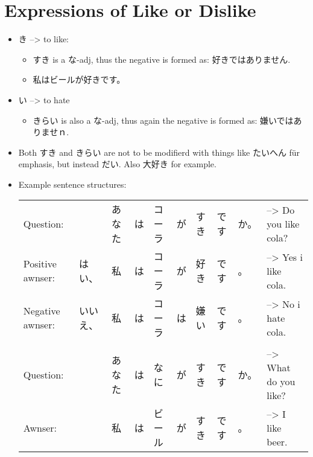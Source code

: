 \documentclass{article}
\newcommand\tab[1][1cm]{\hspace*{#1}}
\begin{document}
\section{Expressions of Like or Dislike}
\begin{itemize}
\item {}き --> to like:
\begin{itemize}
\item すき is a な-adj, thus the negative is formed as: 好きではありません.
\item 私はビールが好きです。
\end{itemize}
\item {}い --> to hate %
\begin{itemize}
\item きらい is also a な-adj, thus again the negative is formed as: 嫌いではありませｎ.
\end{itemize}
\item Both すき and きらい are not to be modifierd with things like たいへん für emphasis, but instead だい. Also 大好き for example.
\item Example sentence structures:\\
\begin{tabular}{ l l l l l l l l l l }
Question:&&あなた&は&コーラ&\color{orange}が&すき&です&か。& --> Do you like cola? \\
Positive awnser:&はい、&私&は&コーラ&\color{orange}が&好き&です&。& --> Yes i like cola. \\
Negative awnser:&いいえ、&私&は&コーラ&\color{blue}は&嫌い&です&。& --> No i hate cola. \\ \\
Question:&&あなた&は&なに&\color{orange}が&すき&です&か。& --> What do you like? \\
Awnser:&&私&は&ビール&\color{orange}が&すき&です&。& --> I like beer. \\
\end{tabular}
\end{itemize}
\end{document}
